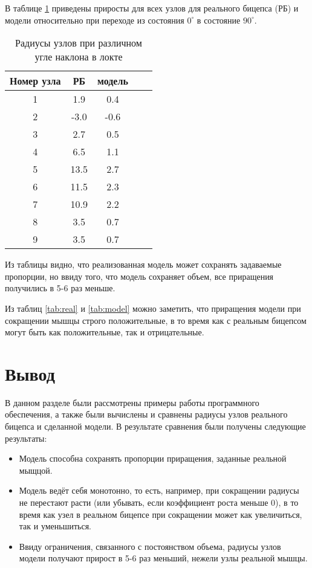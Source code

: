 В таблице \ref{tab:percents} приведены приросты для всех узлов для реального бицепса (РБ) и модели относительно при переходе из состояния $0^\circ$ в состояние $90^\circ$.

\begin{table}[!h]
    \begin{center}
        \begin{tabular}{|c|c|c|c|c|}
            \hline
            Номер узла & РБ & модель \\
            \hline
            \hline
            1 & 1.9 & 0.4 \\
            \hline
            2 & -3.0 & -0.6 \\
            \hline
            3 & 2.7 & 0.5 \\
            \hline
            4 & 6.5 & 1.1 \\
            \hline
            5 & 13.5 & 2.7 \\
            \hline
            6 & 11.5 & 2.3 \\
            \hline
            7 & 10.9 & 2.2 \\
            \hline
            8 & 3.5 & 0.7 \\
            \hline
            9 & 3.5 & 0.7 \\
            \hline
            \hline
        \end{tabular}
    \end{center}
    \caption{\label{tab:percents} Радиусы узлов при различном угле наклона в локте}
\end{table}

Из таблицы видно, что реализованная модель может сохранять задаваемые пропорции, но ввиду того, что модель сохраняет объем, все приращения получились в 5-6 раз меньше.

Из таблиц \ref{tab:real} и \ref{tab:model} можно заметить, что приращения модели при сокращении мышцы строго положительные, в то время как с реальным бицепсом могут быть как положительные, так и отрицательные.


\section*{Вывод}

В данном разделе были рассмотрены примеры работы программного обеспечения, а также были вычислены и сравнены радиусы узлов реального бицепса и сделанной модели. В результате сравнения были получены следующие результаты:
\begin{itemize}
    \item Модель способна сохранять пропорции приращения, заданные реальной мыщцой.
    \item Модель ведёт себя монотонно, то есть, например, при сокращении радиусы не перестают расти (или убывать, если коэффициент роста меньше 0), в то время как узел в реальном бицепсе при сокращении может как увеличиться, так и уменьшиться.
    \item Ввиду ограничения, связанного с постоянством объема, радиусы узлов модели получают прирост в 5-6 раз меньший, нежели узлы реальной мышцы.
\end{itemize}

